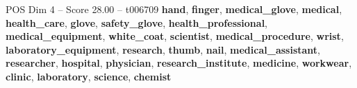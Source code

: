\begin{textsample}{POS Dim 4 – Score 28.00 – t006709}  \label{ex:f4_pos_034}
\textbf{hand}, \textbf{finger}, \textbf{medical\_glove}, \textbf{medical}, \textbf{health\_care}, \textbf{glove}, \textbf{safety\_glove}, \textbf{health\_professional}, \textbf{medical\_equipment}, \textbf{white\_coat}, \textbf{scientist}, \textbf{medical\_procedure}, \textbf{wrist}, \textbf{laboratory\_equipment}, \textbf{research}, \textbf{thumb}, \textbf{nail}, \textbf{medical\_assistant}, \textbf{researcher}, \textbf{hospital}, \textbf{physician}, \textbf{research\_institute}, \textbf{medicine}, \textbf{workwear}, \textbf{clinic}, \textbf{laboratory}, \textbf{science}, \textbf{chemist}

\end{textsample}
